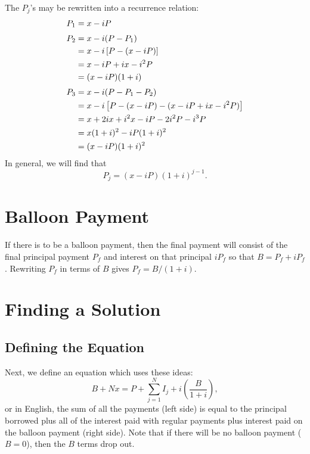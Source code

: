 
The $P_j$'s may be rewritten into a recurrence relation:
\begin{align*}
P_1 &{}= x - iP\\
\noalign{\smallskip}
P_2 &{}= x - i(P - P_1)\\
&{}= x - i\left[P - (x - iP)\right]\\
&{}= x - iP + ix - i^2P\\
&{}= (x - iP)(1 + i)\\
\noalign{\smallskip}
P_3 &{}= x - i(P - P_1 - P_2)\\
&{}= x - i\left[P - (x - iP) - (x - iP + ix - i^2P)\right]\\
&{}= x + 2ix + i^2x - iP - 2i^2P - i^3P\\
&{}= x(1 + i)^2 - iP(1 + i)^2\\
&{}= (x - iP)(1 + i)^2
\end{align*}
In general, we will find that
\begin{equation}
\label{amort:recurrence}
P_j = (x - iP)(1 + i)^{j-1}.
\end{equation}

\section{Balloon Payment}
If there is to be a balloon payment, then the final payment will
consist of the final principal payment $P_f$ and interest on that
principal $i P_f$ so that $B = P_f + iP_f$.  Rewriting $P_f$ in terms
of $B$ gives $P_f = B/(1+i)$.

\section{Finding a Solution}
\subsection{Defining the Equation}
Next, we define an equation which uses these ideas:
\begin{equation}
\label{amort:sums}
B + Nx = P + \sum_{j=1}^N I_j + i\left(\frac{B}{1+i}\right),
\end{equation}
or in English, the sum of all the payments (left side) is equal to the
principal borrowed plus all of the interest paid with regular payments
plus interest paid on the balloon payment (right side).
Note that if there will be no balloon payment ($B=0$), then the $B$
terms drop out.

